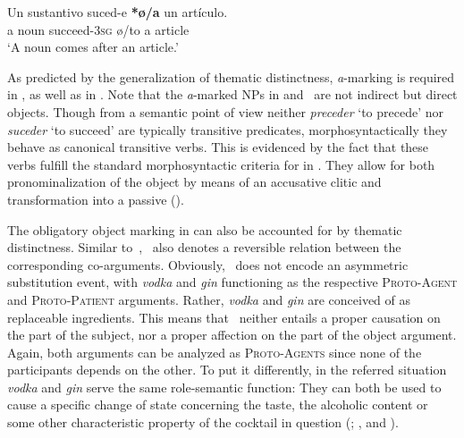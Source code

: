 \documentclass[output=paper]{LSP/langsci}
\begin{document}
\ea \label{08-ga-ex:19} 
\gll Un sustantivo suced-e \textbf{*ø/a} un artículo.\\
 a noun succeed-3\textsc{sg} ø/to a article\\
\glt ‘A noun comes after an article.’
\z

As predicted by the generalization of thematic distinctness, \textit{a}-marking is required in , as well as in . Note that the \textit{a}-marked NPs in  and~ are not indirect but direct objects. Though from a semantic point of view neither \textit{preceder} ‘to precede’ nor \textit{suceder} ‘to succeed’ are typically transitive predicates, morphosyntactically they behave as canonical transitive verbs. This is evidenced by the fact that these verbs fulfill the standard morphosyntactic criteria for  in . They allow for both pronominalization of the object by means of an accusative clitic and transformation into a passive (\cf \citealt[55--56]{GarciaGarcia2014Objektmarkierung}). 

The obligatory object marking in  can also be accounted for by thematic distinctness. Similar to~,~ also denotes a reversible relation between the corresponding co-arguments. Obviously,~ does not encode an asymmetric substitution event, with \textit{vodka} and\textit{ gin} functioning as the respective \textsc{Proto-Agent} and \textsc{Proto-Patient} arguments. Rather, \textit{vodka} and\textit{ gin} are conceived of as replaceable ingredients. This means that~ neither entails a proper causation on the part of the subject, nor a proper affection on the part of the object argument. Again, both arguments can be analyzed as \textsc{Proto-Agents} since none of the participants depends on the other. To put it differently, in the referred situation \textit{vodka} and\textit{ gin} serve the same role-semantic function: They can both be used to cause a specific change of state concerning the taste, the alcoholic content or some other characteristic property of the cocktail in question (\cf \citealt[80]{Garcia2007Inanimate};  \citeyear[137--138]{GarciaGarcia2014Objektmarkierung}, and \citealt[78]{Primus2012Animacy}).
\end{document}
